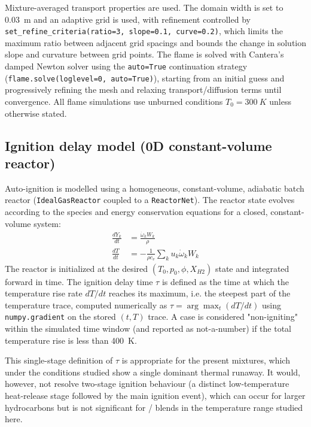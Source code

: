 \documentclass[11pt,a4paper]{article}
\begin{document}
Mixture-averaged transport properties are used. The domain width is set to \SI{0.03}{m} and an adaptive grid is
used, with refinement controlled by \texttt{set\_refine\_criteria(ratio=3, slope=0.1, curve=0.2)}, which limits the
maximum ratio between adjacent grid spacings and bounds the change in solution slope and curvature between grid
points. The flame is solved with Cantera's damped Newton solver using the \texttt{auto=True} continuation strategy
(\texttt{flame.solve(loglevel=0, auto=True)}), starting from an initial guess and progressively refining the mesh
and relaxing transport/diffusion terms until convergence. All flame simulations use unburned conditions
$T_0=\SI{300}{K}$ unless otherwise stated.

\subsection{Ignition delay model (0D constant-volume reactor)}
\label{sec:ignition_model}

Auto-ignition is modelled using a homogeneous, constant-volume, adiabatic batch reactor\linebreak
(\texttt{IdealGasReactor} coupled to a \texttt{ReactorNet}). The reactor state evolves according to the
species and energy conservation equations for a closed, constant-volume system:
\begin{align}
    \frac{dY_k}{dt} &= \frac{\dot{\omega}_k W_k}{\rho} \\
    \frac{dT}{dt} &= -\frac{1}{\rho c_v}\sum_k u_k \dot{\omega}_k W_k
\end{align}
The reactor is initialized at the desired $(T_0, p_0, \phi, X_{H2})$ state and integrated forward in time. The
ignition delay time $\tau$ is defined as the time at which the temperature rise rate $dT/dt$ reaches its maximum,
i.e. the steepest part of the temperature trace, computed numerically as
$\tau = \arg\max_t \left( dT/dt \right)$ using \texttt{numpy.gradient} on the stored $(t, T)$ trace. A case is
considered "non-igniting" within the simulated time window (and reported as not-a-number) if the total temperature
rise is less than \SI{400}{K}.

This single-stage definition of $\tau$ is appropriate for the present mixtures, which under the conditions studied
show a single dominant thermal runaway. It would, however, not resolve two-stage ignition behaviour (a distinct
low-temperature heat-release stage followed by the main ignition event), which can occur for larger hydrocarbons
but is not significant for / blends in the temperature range studied here.
\end{document}
